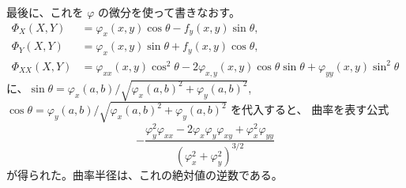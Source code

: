 \documentclass[a4paper]{jsarticle}
\theoremstyle{definition}
\theoremstyle{remark}
\begin{document}
最後に、これを $\varphi$ の微分を使って書きなおす。
\begin{align*}
\Phi_X(X,Y) &= \varphi_x(x,y) \cos \theta - f_y(x,y) \sin \theta,\\ 
\Phi_Y(X,Y) &= \varphi_x(x,y) \sin \theta + f_y(x,y) \cos \theta,\\ 
\Phi_{XX}(X,Y) &= \varphi_{xx}(x,y) \cos^2\theta - 2\varphi_{x,y}(x,y) \cos\theta\sin\theta 
+ \varphi_{yy}(x,y) \sin^2\theta 
\end{align*}
に、$\sin \theta = \varphi_x(a,b)/\sqrt{\varphi_x(a,b)^2 + \varphi_y(a,b)^2}$, 
$\cos \theta = \varphi_y(a,b)/\sqrt{\varphi_x(a,b)^2 + \varphi_y(a,b)^2}$ を代入すると、
曲率を表す公式
\[
-\frac{\varphi_y^2 \varphi_{xx} - 2 \varphi_x \varphi_y \varphi_{xy} + \varphi_x^2 \varphi_{yy}}
{(\varphi_x^2 + \varphi_y^2)^{3/2}}
\]
が得られた。曲率半径は、これの絶対値の逆数である。

\printindex
\end{document}
